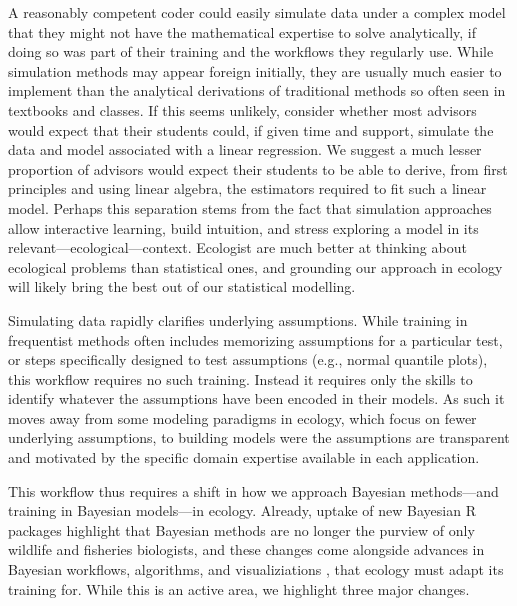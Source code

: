 \documentclass[11pt]{article}
\begin{document}
{A reasonably competent coder could easily simulate data under a complex model that they might not have the mathematical expertise to solve analytically, if doing so was part of their training and the workflows they regularly use. While simulation methods may appear foreign initially, they are usually much easier to implement than the analytical derivations of traditional methods so often seen in textbooks and classes. If this seems unlikely, consider whether most advisors would expect that their students could, if given time and support, simulate the data and model associated with a linear regression. We suggest a much lesser proportion of advisors would expect their students to be able to derive, from first principles and using linear algebra, the estimators required to fit such a linear model. Perhaps this separation stems from the fact that simulation approaches allow interactive learning, build intuition, and stress exploring a model in its relevant---ecological---context. Ecologist are much better at thinking about ecological problems than statistical ones, and grounding our approach in ecology will likely bring the best out of our statistical modelling. %

Simulating data rapidly clarifies underlying assumptions. While training in frequentist methods often includes memorizing assumptions for a particular test, or steps specifically designed to test assumptions (e.g., normal quantile plots), this workflow requires no such training. Instead it requires only the skills to identify whatever the assumptions have been encoded in their
models. As such it moves away from some modeling paradigms in ecology, which focus on fewer underlying assumptions, to
building models were the assumptions are transparent and motivated by the specific domain expertise available in each
application. %


This workflow thus requires a shift in how we approach Bayesian methods---and training in Bayesian models---in ecology. Already, uptake of new Bayesian \textsf{R} packages highlight that Bayesian methods are no longer the purview of only wildlife and fisheries biologists, and these changes come alongside advances in Bayesian workflows, algorithms, and visualiziations \citep[e.g.][]{betanworkflow,vandeschoot2021,gabryvis}, that ecology must adapt its training for. While this is an active area, we highlight three major changes.

}
\end{document}
